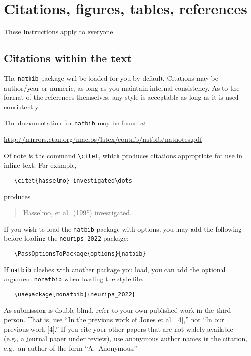 \documentclass{article}
\begin{document}
\section{Citations, figures, tables, references}
\label{others}

These instructions apply to everyone.

\subsection{Citations within the text}

The \verb+natbib+ package will be loaded for you by default. Citations may be
author/year or numeric, as long as you maintain internal consistency. As to the
format of the references themselves, any style is acceptable as long as it is
used consistently.

The documentation for \verb+natbib+ may be found at
\begin{center}
      \url{http://mirrors.ctan.org/macros/latex/contrib/natbib/natnotes.pdf}
\end{center}
Of note is the command \verb+\citet+, which produces citations appropriate for
use in inline text.  For example,
\begin{verbatim}
   \citet{hasselmo} investigated\dots
\end{verbatim}
produces
\begin{quote}
      Hasselmo, et al.\ (1995) investigated\dots
\end{quote}

If you wish to load the \verb+natbib+ package with options, you may add the
following before loading the \verb+neurips_2022+ package:
\begin{verbatim}
   \PassOptionsToPackage{options}{natbib}
\end{verbatim}

If \verb+natbib+ clashes with another package you load, you can add the
optional argument \verb+nonatbib+ when loading the style file:
\begin{verbatim}
   \usepackage[nonatbib]{neurips_2022}
\end{verbatim}

As submission is double blind, refer to your own published work in the third
person. That is, use ``In the previous work of Jones et al.\ [4],'' not ``In
our previous work [4].'' If you cite your other papers that are not widely
available (e.g., a journal paper under review), use anonymous author names in
the citation, e.g., an author of the form ``A.\ Anonymous.''
\end{document}
